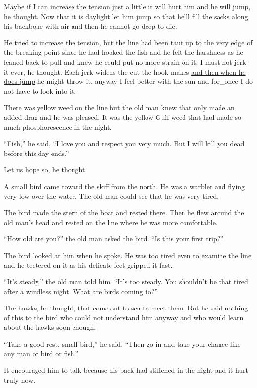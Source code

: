 \documentclass[fontset=ubuntu]{ctexrep}
\begin{document}
Maybe if I can increase the tension just a little it will hurt him and he
will jump, he thought. Now that it is daylight let him jump so that he'll
fill the sacks along his \gls{backbone} with air and then he cannot go deep to
die.

He tried to increase the tension, but the line had been taut up to the very
edge of the breaking point since he had hooked the fish and he felt the
\gls{harshness} as he leaned back to pull and knew he could put no more
strain on it. I must not jerk it ever, he thought. Each jerk \glspl{widen}
the cut the hook makes \uline{and then when he does jump} he might throw it.
\Gls{anyway} I feel better with the sun and \gls{for_once} I do not have to look
into it.

There was yellow weed on the line but the old man knew that only made an
added \gls{drag} and he was pleased. It was the yellow Gulf weed that had
made so much phosphorescence in the night.

``Fish,'' he said, ``I love you and respect you very much. But I will kill
you dead before this day ends.''

Let us hope so, he thought.

A small bird came toward the skiff from the north. He was a \gls{warbler} and
flying very low over the water. The old man could see that he was very
tired.

The bird made the stern of the boat and rested there. Then he flew
around the old man's head and rested on the line where he was more
comfortable.

``How old are you?'' the old man asked the bird. ``Is this your first trip?''

The bird looked at him when he spoke. He was \uline{too} tired \uline{even
  to} examine the line and he \gls{teetered} on it as his delicate feet
\gls{gripped} it fast.

``It's steady,'' the old man told him. ``It's too steady. You shouldn't be
that tired after a windless night. What are birds coming to?''

The \glspl{hawk}, he thought, that come out to sea to meet them. But he said
nothing of this to the bird who could not understand him anyway and who
would learn about the hawks soon enough.

``Take a good rest, small bird,'' he said. ``Then go in and take your chance
like any man or bird or fish.''

It \gls{encouraged} him to talk because his back had \gls{stiffened} in the
night and it hurt truly now.
\end{document}
